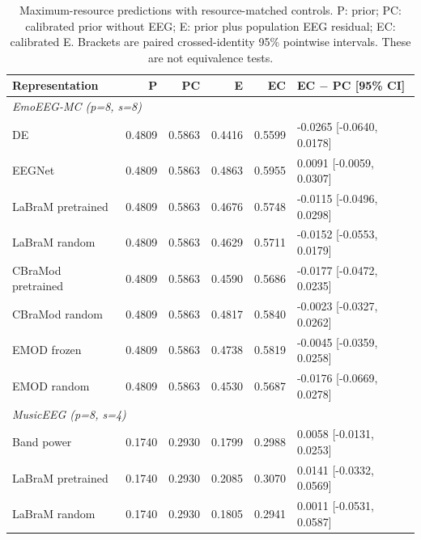 \begin{table}[t]
\centering\small
\setlength{\tabcolsep}{3pt}
\caption{Maximum-resource predictions with resource-matched controls. P: prior; PC: calibrated prior without EEG; E: prior plus population EEG residual; EC: calibrated E. Brackets are paired crossed-identity 95\% pointwise intervals. These are not equivalence tests.}
\label{tab:paired-added-value}
\begin{tabular}{@{}lrrrrl@{}}
\toprule
Representation & P & PC & E & EC & EC $-$ PC [95\% CI] \\
\midrule
\multicolumn{6}{l}{\textit{EmoEEG-MC (p=8, s=8)}} \\
DE & 0.4809 & 0.5863 & 0.4416 & 0.5599 & -0.0265 [-0.0640, 0.0178] \\
EEGNet & 0.4809 & 0.5863 & 0.4863 & 0.5955 & 0.0091 [-0.0059, 0.0307] \\
LaBraM pretrained & 0.4809 & 0.5863 & 0.4676 & 0.5748 & -0.0115 [-0.0496, 0.0298] \\
LaBraM random & 0.4809 & 0.5863 & 0.4629 & 0.5711 & -0.0152 [-0.0553, 0.0179] \\
CBraMod pretrained & 0.4809 & 0.5863 & 0.4590 & 0.5686 & -0.0177 [-0.0472, 0.0235] \\
CBraMod random & 0.4809 & 0.5863 & 0.4817 & 0.5840 & -0.0023 [-0.0327, 0.0262] \\
EMOD frozen & 0.4809 & 0.5863 & 0.4738 & 0.5819 & -0.0045 [-0.0359, 0.0258] \\
EMOD random & 0.4809 & 0.5863 & 0.4530 & 0.5687 & -0.0176 [-0.0669, 0.0278] \\
\midrule
\multicolumn{6}{l}{\textit{MusicEEG (p=8, s=4)}} \\
Band power & 0.1740 & 0.2930 & 0.1799 & 0.2988 & 0.0058 [-0.0131, 0.0253] \\
LaBraM pretrained & 0.1740 & 0.2930 & 0.2085 & 0.3070 & 0.0141 [-0.0332, 0.0569] \\
LaBraM random & 0.1740 & 0.2930 & 0.1805 & 0.2941 & 0.0011 [-0.0531, 0.0587] \\
\bottomrule
\end{tabular}
\end{table}
